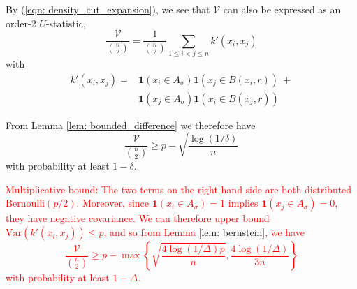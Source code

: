 \documentclass{article}
\newcommand{\1}{\mathbf{1}}
\newcommand{\var}{\mathrm{Var}}
\theoremstyle{aldenthm}
\begin{document}
By (\ref{eqn: density_cut_expansion}), we see that $\mathcal{V}$ can also be expressed as an order-2 $U$-statistic,
\begin{equation*}
\frac{\mathcal{V}}{ {n \choose 2} } = \frac{1}{{n \choose 2}} \sum_{1 \leq i < j \leq n } k'(x_i, x_j)
\end{equation*}
with
\begin{align*}
k'(x_i,x_j)  = & \1(x_i \in A_\sigma)\1(x_j \in B(x_i,r)) ~ + \\
& \1(x_j \in A_{\sigma})\1(x_i \in B(x_j,r))
\end{align*}

From Lemma \ref{lem: bounded_difference} we therefore have
\begin{equation}
\label{eqn: denominator_additive_bound}
\frac{\mathcal{V}}{{n \choose 2}} \geq p - \sqrt{\frac{\log(1/\delta)}{n}}
\end{equation}
with probability at least $1 - \delta$.

\textcolor{red}{Multiplicative bound: The two terms on the right hand side are both distributed $\mathrm{Bernoulli}(p/2)$. Moreover, since $\1(x_i \in A_\sigma) = 1$ implies $\1(x_j \in A_{\sigma}) = 0$, they have negative covariance. We can therefore upper bound $\var(k'(x_i,x_j)) \leq p$, and so from Lemma \ref{lem: bernstein}, we have
\begin{equation*}
\frac{\mathcal{V}}{{n \choose 2}} \geq p - \max\left\{ \sqrt{\frac{4\log(1/\Delta)p}{n}}, \frac{4 \log(1/\Delta)}{3n} \right\}
\end{equation*}
with probability at least $1 - \Delta$. }
\end{document}
